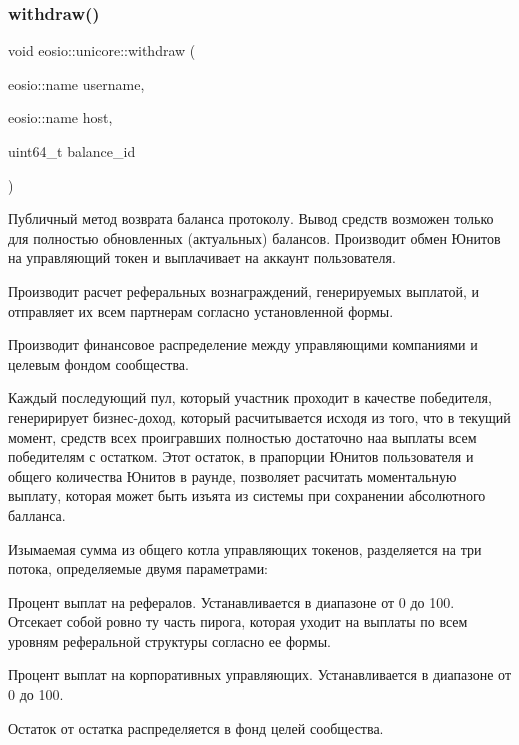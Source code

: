 \subsubsection{\texorpdfstring{withdraw()}{withdraw()}}
{\footnotesize\ttfamily void eosio\+::unicore\+::withdraw (\begin{DoxyParamCaption}\item[{eosio\+::name}]{username,  }\item[{eosio\+::name}]{host,  }\item[{uint64\+\_\+t}]{balance\+\_\+id }\end{DoxyParamCaption})}



Публичный метод возврата баланса протоколу. Вывод средств возможен только для полностью обновленных (актуальных) балансов. Производит обмен Юнитов на управляющий токен и выплачивает на аккаунт пользователя. 

Производит расчет реферальных вознаграждений, генерируемых выплатой, и отправляет их всем партнерам согласно установленной формы.

Производит финансовое распределение между управляющими компаниями и целевым фондом сообщества.

Каждый последующий пул, который участник проходит в качестве победителя, генеририрует бизнес-\/доход, который расчитывается исходя из того, что в текущий момент, средств всех проигравших полностью достаточно наа выплаты всем победителям с остатком. Этот остаток, в прапорции Юнитов пользователя и общего количества Юнитов в раунде, позволяет расчитать моментальную выплату, которая может быть изъята из системы при сохранении абсолютного балланса.

Изымаемая сумма из общего котла управляющих токенов, разделяется на три потока, определяемые двумя параметрами\+:
\begin{DoxyItemize}
\item Процент выплат на рефералов. Устанавливается в диапазоне от 0 до 100. Отсекает собой ровно ту часть пирога, которая уходит на выплаты по всем уровням реферальной структуры согласно ее формы.
\item Процент выплат на корпоративных управляющих. Устанавливается в диапазоне от 0 до 100.
\item Остаток от остатка распределяется в фонд целей сообщества.
\end{DoxyItemize}

